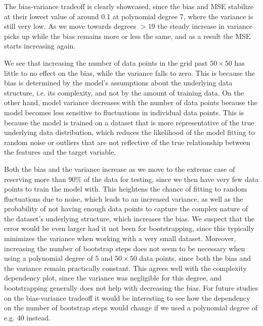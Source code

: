 \documentclass[aps,pra,english,notitlepage,reprint,nofootinbib]{revtex4-1}  %
\begin{document}
The bias-variance tradeoff is clearly showcased, since the bias and MSE stabilize at their lowest value of around 0.1 at polynomial degree 7, where the variance is still very low. As we move towards degrees $>19$ the steady increase in variance picks up while the bias remains more or less the same, and as a result the MSE starts increasing again. 

We see that increasing the number of data points in the grid past $50\times50$ has little to no effect on the bias, while the variance falls to zero. This is because the bias is determined by the model's assumptions about the underlying data structure, i.e. its complexity, and not by the amount of training data. On the other hand, model variance decreases with the number of data points because the model becomes less sensitive to fluctuations in individual data points. This is because the model is trained on a dataset that is more representative of the true underlying data distribution, which reduces the likelihood of the model fitting to random noise or outliers that are not reflective of the true relationship between the features and the target variable. 

Both the bias and the variance increase as we move to the extreme case of reserving more than 90\% of the data for testing, since we then have very few data points to train the model with. This heightens the chance of fitting to random fluctuations due to noise, which leads to an increased variance, as well as the probability of not having enough data points to capture the complex nature of the dataset's underlying structure, which increases the bias. We suspect that the error would be even larger had it not been for bootstrapping, since this typically minimizes the variance when working with a very small dataset. Moreover, increasing the number of bootstrap steps does not seem to be necessary when using a polynomial degree of 5 and $50\times50$ data points, since both the bias and the variance remain practically constant. This agrees well with the complexity dependency plot, since the variance was negligible for this degree, and bootstrapping generally does not help with decreasing the bias. For future studies on the bias-variance tradeoff it would be interesting to see how the dependency on the number of bootstrap steps would change if we used a polynomial degree of e.g. 40 instead. 
\end{document}

